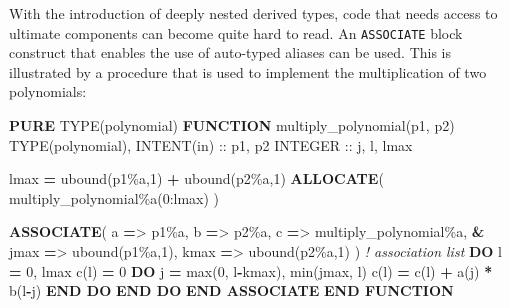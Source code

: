 \documentclass[]{scrartcl}
\newenvironment{Shaded}{}{}
\newcommand{\BuiltInTok}[1]{\textcolor[rgb]{0.00,0.50,0.00}{#1}}
\newcommand{\CommentTok}[1]{\textcolor[rgb]{0.38,0.63,0.69}{\textit{#1}}}
\newcommand{\DataTypeTok}[1]{\textcolor[rgb]{0.56,0.13,0.00}{#1}}
\newcommand{\DecValTok}[1]{\textcolor[rgb]{0.25,0.63,0.44}{#1}}
\newcommand{\FunctionTok}[1]{\textcolor[rgb]{0.02,0.16,0.49}{#1}}
\newcommand{\KeywordTok}[1]{\textcolor[rgb]{0.00,0.44,0.13}{\textbf{#1}}}
\newcommand{\NormalTok}[1]{#1}
\newcommand{\OperatorTok}[1]{\textcolor[rgb]{0.40,0.40,0.40}{#1}}
\begin{document}
With the introduction of deeply nested derived types, code that needs
access to ultimate components can become quite hard to read. An
\texttt{ASSOCIATE} block construct that enables the use of auto-typed
aliases can be used. This is illustrated by a procedure that is used to
implement the multiplication of two polynomials:

\begin{Shaded}
\begin{Highlighting}[]
\KeywordTok{PURE} \DataTypeTok{TYPE(polynomial)} \KeywordTok{FUNCTION}\NormalTok{ multiply\_polynomial(p1, p2)}
   \DataTypeTok{TYPE(polynomial)}\NormalTok{, }\DataTypeTok{INTENT(in)} \DataTypeTok{::}\NormalTok{ p1, p2}
   \DataTypeTok{INTEGER} \DataTypeTok{::}\NormalTok{ j, l, lmax}

\NormalTok{   lmax }\KeywordTok{=} \FunctionTok{ubound}\NormalTok{(p1}\OperatorTok{\%}\NormalTok{a,}\DecValTok{1}\NormalTok{) }\KeywordTok{+} \FunctionTok{ubound}\NormalTok{(p2}\OperatorTok{\%}\NormalTok{a,}\DecValTok{1}\NormalTok{)}
   \KeywordTok{ALLOCATE}\NormalTok{( multiply\_polynomial}\OperatorTok{\%}\NormalTok{a(}\DecValTok{0}\NormalTok{:lmax) )}

   \KeywordTok{ASSOCIATE}\NormalTok{( a }\KeywordTok{=}\OperatorTok{\textgreater{}}\NormalTok{ p1}\OperatorTok{\%}\NormalTok{a, b }\KeywordTok{=}\OperatorTok{\textgreater{}}\NormalTok{ p2}\OperatorTok{\%}\NormalTok{a, c }\KeywordTok{=}\OperatorTok{\textgreater{}}\NormalTok{ multiply\_polynomial}\OperatorTok{\%}\NormalTok{a, }\KeywordTok{\&}
\NormalTok{              jmax }\KeywordTok{=}\OperatorTok{\textgreater{}} \FunctionTok{ubound}\NormalTok{(p1}\OperatorTok{\%}\NormalTok{a,}\DecValTok{1}\NormalTok{), kmax }\KeywordTok{=}\OperatorTok{\textgreater{}} \FunctionTok{ubound}\NormalTok{(p2}\OperatorTok{\%}\NormalTok{a,}\DecValTok{1}\NormalTok{) )  }\CommentTok{! association list}
      \KeywordTok{DO}\NormalTok{ l }\KeywordTok{=} \DecValTok{0}\NormalTok{, lmax}
\NormalTok{         c(l) }\KeywordTok{=} \DecValTok{0}
         \KeywordTok{DO}\NormalTok{ j }\KeywordTok{=} \BuiltInTok{max}\NormalTok{(}\DecValTok{0}\NormalTok{, l}\KeywordTok{{-}}\NormalTok{kmax), }\BuiltInTok{min}\NormalTok{(jmax, l)}
\NormalTok{            c(l) }\KeywordTok{=}\NormalTok{ c(l) }\KeywordTok{+}\NormalTok{ a(j) }\KeywordTok{*}\NormalTok{ b(l}\KeywordTok{{-}}\NormalTok{j)}
         \KeywordTok{END DO}
      \KeywordTok{END DO}
   \KeywordTok{END ASSOCIATE}
\KeywordTok{END FUNCTION}
\end{Highlighting}
\end{Shaded}
\end{document}
